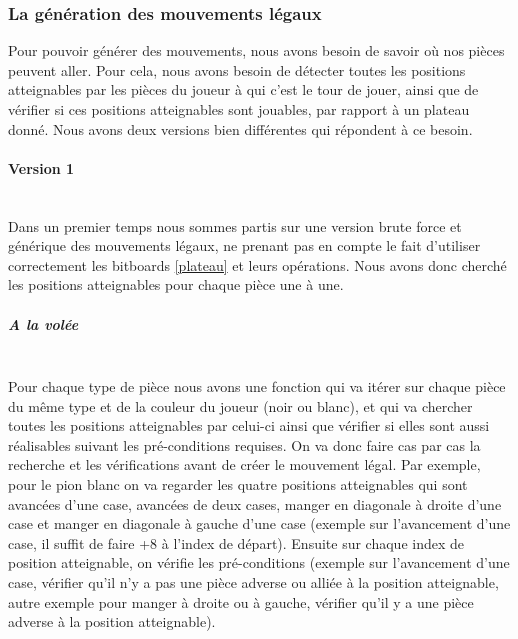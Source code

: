 \huge\documentclass{article}
\begin{document}
    \subsubsection{La génération des mouvements légaux}
    Pour pouvoir générer des mouvements, nous avons besoin de savoir où nos pièces peuvent aller.
    Pour cela, nous avons besoin de détecter toutes les positions atteignables par les pièces du joueur à qui c’est le tour de jouer, ainsi que de vérifier si ces positions atteignables sont jouables, par rapport à un plateau donné.
    Nous avons deux versions bien différentes qui répondent à ce besoin.

    \paragraph{Version 1} \label{mouvements_legaux_v1}
    ~~\\
    \newline
    Dans un premier temps nous sommes partis sur une version brute force et générique des mouvements légaux, ne prenant pas en compte le fait d’utiliser correctement les bitboards \ref{plateau} et leurs opérations.
    Nous avons donc cherché les positions atteignables pour chaque pièce une à une.

    \subparagraph{A la volée}
    ~~\\
    \newline
    Pour chaque type de pièce nous avons une fonction qui va itérer sur chaque pièce du même type et de la couleur du joueur (noir ou blanc), et qui va chercher toutes les positions atteignables par celui-ci ainsi que vérifier si elles sont aussi réalisables suivant les pré-conditions requises.
    On va donc faire cas par cas la recherche et les vérifications avant de créer le mouvement légal.
    Par exemple, pour le pion blanc on va regarder les quatre positions atteignables qui sont avancées d'une case, avancées de deux cases, manger en diagonale à droite d'une case et manger en diagonale à gauche d'une case (exemple sur l'avancement d'une case, il suffit de faire +8 à l'index de départ).
    Ensuite sur chaque index de position atteignable, on vérifie les pré-conditions (exemple sur l'avancement d'une case, vérifier qu'il n'y a pas une pièce adverse ou alliée à la position atteignable, autre exemple pour manger à droite ou à gauche, vérifier qu'il y a une pièce adverse à la position atteignable).
\end{document}
